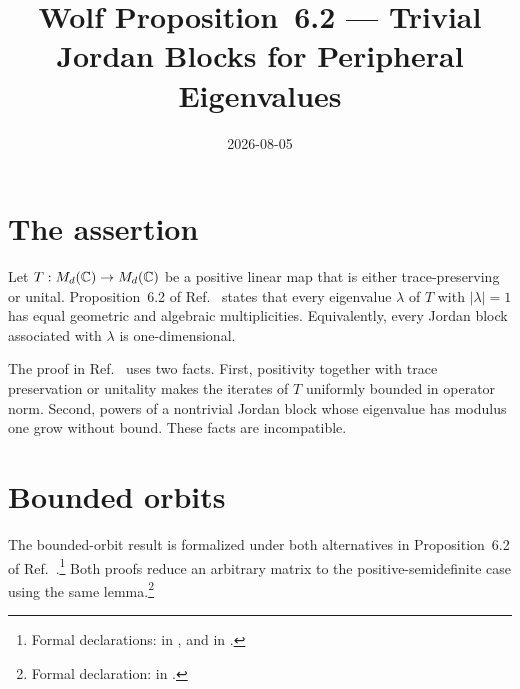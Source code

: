 \documentclass{article}
\title{Wolf Proposition~6.2 --- Trivial Jordan Blocks for Peripheral Eigenvalues}
\author{}
\date{2026-08-05}
\begin{document}
\maketitle
{}

\section{The assertion}

Let $T:M_{d}(\mathbb{C})\to M_{d}(\mathbb{C})$ be a positive linear map that is either
trace-preserving or unital. Proposition~6.2 of Ref.~\cite{Wolf2012Quantum}
states that every eigenvalue $\lambda$ of $T$ with $|\lambda|=1$ has equal
geometric and algebraic multiplicities. Equivalently, every Jordan block
associated with $\lambda$ is one-dimensional.

The proof in Ref.~\cite{Wolf2012Quantum} uses two facts. First, positivity
together with trace preservation or unitality makes the iterates of $T$
uniformly bounded in operator norm. Second, powers of a nontrivial Jordan block
whose eigenvalue has modulus one grow without bound. These facts are
incompatible.

\section{Bounded orbits}

The bounded-orbit result is formalized under both alternatives in
Proposition~6.2 of Ref.~\cite{Wolf2012Quantum}.\footnote{Formal declarations:
     in
    , and
     in
    .}
Both proofs reduce an arbitrary matrix to the positive-semidefinite case using
the same lemma.\footnote{Formal declaration:
     in
    .}
\end{document}
